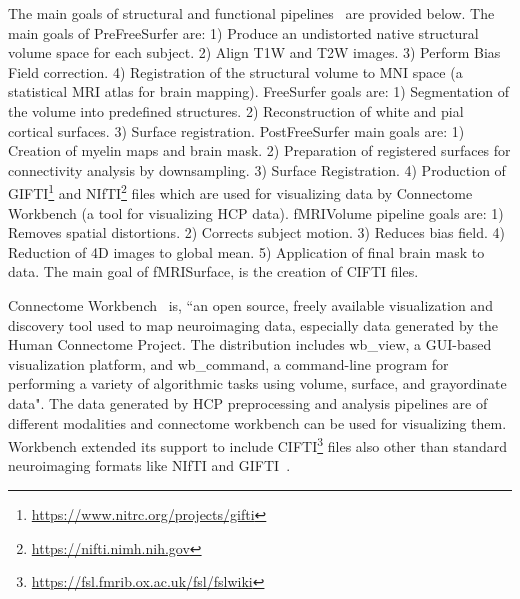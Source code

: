 The main goals of structural and functional pipelines~\cite{Gla13} are provided below. The main goals of PreFreeSurfer are: 1) Produce an undistorted native structural volume space for each subject. 2) Align T1W and T2W images. 3) Perform Bias Field correction. 4) Registration of the structural volume to MNI space (a statistical MRI atlas for brain mapping). FreeSurfer goals are: 1) Segmentation of the volume into predefined structures. 2) Reconstruction of white and pial cortical surfaces. 3) Surface registration. PostFreeSurfer main goals are: 1) Creation of myelin maps and brain mask. 2) Preparation of registered surfaces for connectivity analysis by downsampling. 3) Surface Registration. 4) Production of GIFTI\footnote{\url{https://www.nitrc.org/projects/gifti}} and NIfTI\footnote{\url{https://nifti.nimh.nih.gov}} files which are used for visualizing data by Connectome Workbench (a tool for visualizing HCP data). fMRIVolume pipeline goals are: 1) Removes spatial distortions. 2) Corrects subject motion. 3) Reduces bias field. 4) Reduction of 4D images to global mean. 5) Application of final brain mask to data. The main goal of fMRISurface, is the creation of CIFTI files.

Connectome Workbench~\cite{wb_workbench} is, ``an open source, freely available visualization and discovery tool used to map neuroimaging data, especially data generated by the Human Connectome Project. The distribution includes wb\_view, a GUI-based visualization platform, and wb\_command, a command-line program for performing a variety of algorithmic tasks using volume, surface, and grayordinate data". The data generated by HCP preprocessing and analysis pipelines are of different modalities and connectome workbench can be used for visualizing them. Workbench extended its support to include CIFTI\footnote{\url{https://fsl.fmrib.ox.ac.uk/fsl/fslwiki}} files also other than standard neuroimaging formats like NIfTI and GIFTI~\cite{journals/neuroimage/MarcusHSJWGBABRHHHOMHHRHCSECE13}.
 

